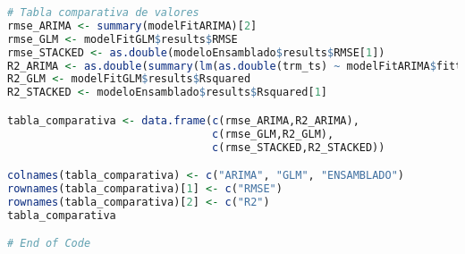 \begin{lstlisting}[language=R]
# Tabla comparativa de valores
rmse_ARIMA <- summary(modelFitARIMA)[2]
rmse_GLM <- modelFitGLM$results$RMSE
rmse_STACKED <- as.double(modeloEnsamblado$results$RMSE[1])
R2_ARIMA <- as.double(summary(lm(as.double(trm_ts) ~ modelFitARIMA$fitted))[8])
R2_GLM <- modelFitGLM$results$Rsquared
R2_STACKED <- modeloEnsamblado$results$Rsquared[1]

tabla_comparativa <- data.frame(c(rmse_ARIMA,R2_ARIMA),
                                c(rmse_GLM,R2_GLM),
                                c(rmse_STACKED,R2_STACKED))

colnames(tabla_comparativa) <- c("ARIMA", "GLM", "ENSAMBLADO")
rownames(tabla_comparativa)[1] <- c("RMSE")
rownames(tabla_comparativa)[2] <- c("R2")
tabla_comparativa

# End of Code
\end{lstlisting}
